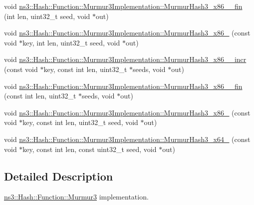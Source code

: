 \begin{DoxyCompactItemize}
\item 
void \hyperlink{group__hash__murmur3_gaa7a43fb3327475729d3da771a405aa0c}{ns3\+::\+Hash\+::\+Function\+::\+Murmur3\+Implementation\+::\+Murmur\+Hash3\+\_\+x86\+\_\+\_\+fin} (int len, uint32\+\_\+t seed, void $\ast$out)
\item 
void \hyperlink{group__hash__murmur3_ga05715b47dc242ffd2bb485451ecc6cc9}{ns3\+::\+Hash\+::\+Function\+::\+Murmur3\+Implementation\+::\+Murmur\+Hash3\+\_\+x86\+\_} (const void $\ast$key, int len, uint32\+\_\+t seed, void $\ast$out)
\item 
void \hyperlink{group__hash__murmur3_ga284086a230b4549dd730837edf8c25e6}{ns3\+::\+Hash\+::\+Function\+::\+Murmur3\+Implementation\+::\+Murmur\+Hash3\+\_\+x86\+\_\+\_\+incr} (const void $\ast$key, const int len, uint32\+\_\+t $\ast$seeds, void $\ast$out)
\item 
void \hyperlink{group__hash__murmur3_ga9b5a153dfe6a69d25f8d90fc9b7aee32}{ns3\+::\+Hash\+::\+Function\+::\+Murmur3\+Implementation\+::\+Murmur\+Hash3\+\_\+x86\+\_\+\_\+fin} (const int len, uint32\+\_\+t $\ast$seeds, void $\ast$out)
\item 
void \hyperlink{group__hash__murmur3_ga7bc4daaa97ce24425471bb2231316be9}{ns3\+::\+Hash\+::\+Function\+::\+Murmur3\+Implementation\+::\+Murmur\+Hash3\+\_\+x86\+\_} (const void $\ast$key, const int len, uint32\+\_\+t seed, void $\ast$out)
\item 
void \hyperlink{group__hash__murmur3_ga2c91387f5b5beb8f4978e5447b5baf20}{ns3\+::\+Hash\+::\+Function\+::\+Murmur3\+Implementation\+::\+Murmur\+Hash3\+\_\+x64\+\_} (const void $\ast$key, const int len, const uint32\+\_\+t seed, void $\ast$out)
\end{DoxyCompactItemize}


\subsection{Detailed Description}
\hyperlink{classns3_1_1Hash_1_1Function_1_1Murmur3}{ns3\+::\+Hash\+::\+Function\+::\+Murmur3} implementation. 

